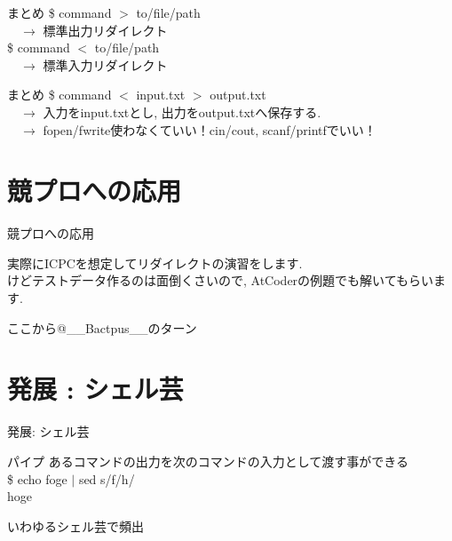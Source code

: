\documentclass[uplatex, dvipdfmx, unicode]{beamer}
\begin{document}
\begin{frame}{まとめ}
  \$ command $>$ to/file/path \\
  \ \ $\rightarrow$ 標準出力リダイレクト \\
  \vspace{.2in}
  \$ command $<$ to/file/path \\
  \ \ $\rightarrow$ 標準入力リダイレクト \\
\end{frame}

\begin{frame}{まとめ}
  \$ command $<$ input.txt $>$ output.txt \\
  \ \ $\rightarrow$ 入力をinput.txtとし, 出力をoutput.txtへ保存する. \\
  \ \ $\rightarrow$ fopen/fwrite使わなくていい！cin/cout, scanf/printfでいい！
\end{frame}

\section{競プロへの応用}

\begin{frame}
  \centering
  \Huge{競プロへの応用}
\end{frame}

\begin{frame}
  実際にICPCを想定してリダイレクトの演習をします. \\
  けどテストデータ作るのは面倒くさいので, AtCoderの例題でも解いてもらいます. \\
\end{frame}

\begin{frame}
  ここから@\_\_Bactpus\_\_のターン
\end{frame}

\section{発展 : シェル芸}
\begin{frame}
  \centering
  \Huge{発展: シェル芸}
\end{frame}

\begin{frame}{パイプ}
  あるコマンドの出力を次のコマンドの入力として渡す事ができる \\
  \$ echo foge $|$ sed s/f/h/ \\
  hoge

  \small いわゆるシェル芸で頻出
\end{frame}
\end{document}

